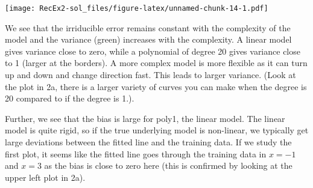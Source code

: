 \documentclass[
]{article}
\newenvironment{Shaded}{\begin{snugshade}}{\end{snugshade}}
\newcommand{\AttributeTok}[1]{\textcolor[rgb]{0.77,0.63,0.00}{#1}}
\newcommand{\DecValTok}[1]{\textcolor[rgb]{0.00,0.00,0.81}{#1}}
\newcommand{\FunctionTok}[1]{\textcolor[rgb]{0.00,0.00,0.00}{#1}}
\newcommand{\NormalTok}[1]{#1}
\newcommand{\OtherTok}[1]{\textcolor[rgb]{0.56,0.35,0.01}{#1}}
\newcommand{\SpecialCharTok}[1]{\textcolor[rgb]{0.00,0.00,0.00}{#1}}
\newcommand{\StringTok}[1]{\textcolor[rgb]{0.31,0.60,0.02}{#1}}
\begin{document}
\begin{Shaded}
\end{Shaded}

\texttt{[image: RecEx2-sol\_files/figure-latex/unnamed-chunk-14-1.pdf]}

We see that the irriducible error remains constant with the complexity
of the model and the variance (green) increases with the complexity. A
linear model gives variance close to zero, while a polynomial of degree
20 gives variance close to 1 (larger at the borders). A more complex
model is more flexible as it can turn up and down and change direction
fast. This leads to larger variance. (Look at the plot in 2a, there is a
larger variety of curves you can make when the degree is 20 compared to
if the degree is 1.).

Further, we see that the bias is large for poly1, the linear model. The
linear model is quite rigid, so if the true underlying model is
non-linear, we typically get large deviations between the fitted line
and the training data. If we study the first plot, it seems like the
fitted line goes through the training data in \(x=-1\) and \(x=3\) as
the bias is close to zero here (this is confirmed by looking at the
upper left plot in 2a).
\end{document}
